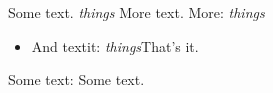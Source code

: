 Some text.
\emph{things}
More text.
More:
\emph{things}
\begin{itemize}
\item And textit:
\textit{things}That's it.
\end{itemize}
Some text:
Some text.


